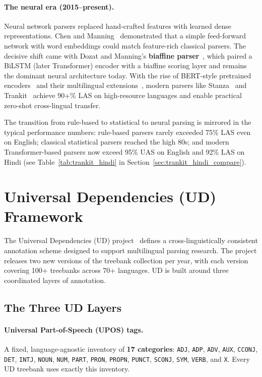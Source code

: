 \documentclass[12pt,a4paper,oneside]{report}
\begin{document}
\paragraph{The neural era (2015--present).}
Neural network parsers replaced hand-crafted features with learned dense
representations. Chen and Manning~\citep{chen2014fast} demonstrated that a
simple feed-forward network with word embeddings could match feature-rich
classical parsers. The decisive shift came with Dozat and Manning's
\textbf{biaffine parser}~\citep{dozat2017deep}, which paired a BiLSTM (later
Transformer) encoder with a biaffine scoring layer and remains the dominant
neural architecture today. With the rise of BERT-style pretrained
encoders~\citep{devlin2019bert} and their multilingual
extensions~\citep{conneau2020xlmr}, modern parsers like Stanza~\citep{qi2020stanza}
and Trankit~\citep{nguyen2021trankit} achieve 90+\% LAS on high-resource
languages and enable practical zero-shot cross-lingual transfer.

The transition from rule-based to statistical to neural parsing is mirrored in
the typical performance numbers: rule-based parsers rarely exceeded 75\% LAS
even on English; classical statistical parsers reached the high 80s; and
modern Transformer-based parsers now exceed 95\% UAS on English and 92\% LAS
on Hindi (see Table~\ref{tab:trankit_hindi} in
Section~\ref{sec:trankit_hindi_compare}).

\section{Universal Dependencies (UD) Framework}
\label{sec:ud_framework}

The Universal Dependencies (UD) project~\citep{nivre2016ud} defines a
cross-linguistically consistent annotation scheme designed to support
multilingual parsing research. The project releases two new versions of the
treebank collection per year, with each version covering 100+ treebanks across
70+ languages. UD is built around three coordinated layers of annotation.

\subsection{The Three UD Layers}

\paragraph{Universal Part-of-Speech (UPOS) tags.}
A fixed, language-agnostic inventory of \textbf{17 categories}: \texttt{ADJ},
\texttt{ADP}, \texttt{ADV}, \texttt{AUX}, \texttt{CCONJ}, \texttt{DET},
\texttt{INTJ}, \texttt{NOUN}, \texttt{NUM}, \texttt{PART}, \texttt{PRON},
\texttt{PROPN}, \texttt{PUNCT}, \texttt{SCONJ}, \texttt{SYM}, \texttt{VERB},
and \texttt{X}. Every UD treebank uses exactly this inventory.
\end{document}
